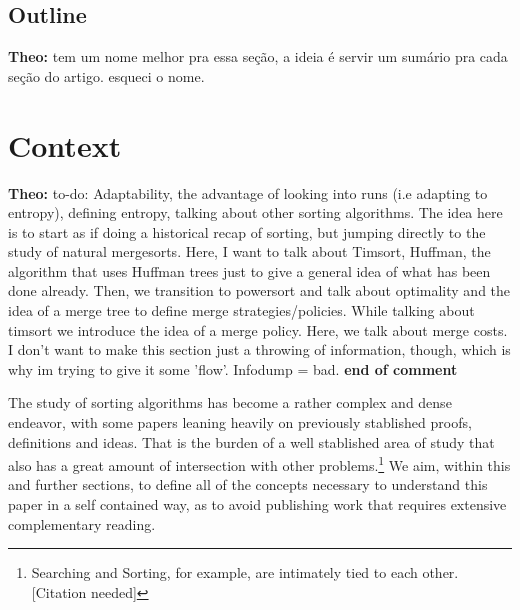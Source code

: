 \documentclass[a4paper]{article}
\theoremstyle{plain}
\theoremstyle{definition}
\begin{document}
\subsection{Outline}
\textbf{Theo:} tem um nome melhor pra essa seção, a ideia é servir um sumário pra cada seção do artigo. esqueci o nome.
\newpage
\section{Context}
\textbf{Theo:} to-do:
Adaptability, the advantage of looking into runs (i.e adapting to entropy), 
defining entropy, talking about other sorting algorithms. 
The idea here is to start as if doing a historical recap of sorting,
but jumping directly to the study of natural mergesorts.
Here, I want to talk about Timsort, Huffman, the algorithm that uses Huffman trees
just to give a general idea of what has been done already. Then,
we transition to powersort and talk about optimality and the idea
of a merge tree to define merge strategies/policies. 
While talking about timsort we introduce the idea of a merge policy.
Here, we talk about merge costs. I don't want to make 
this section just a throwing of information, though, which is why
im trying to give it some 'flow'. Infodump = bad. 
\newline \noindent \textbf{end of comment}


\noindent The study of sorting algorithms has become a rather complex and dense endeavor, with
some papers leaning heavily on previously stablished proofs, definitions and ideas. That is the
burden of a well stablished area of study that also has a great amount of intersection
with other problems.\footnote{Searching and Sorting, for example, are intimately tied to each other. [Citation needed]}
We aim, within this and further sections, to define all of the concepts necessary to understand this paper in a self contained way, as to avoid
publishing work that requires extensive complementary reading.
\end{document}
